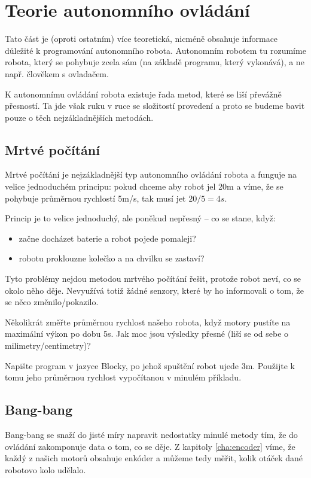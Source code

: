 \documentclass[../main.tex]{subfiles}
\begin{document}
	\section{Teorie autonomního ovládání}

	Tato část je (oproti ostatním) více teoretická, nicméně obsahuje informace důležité k programování autonomního robota. Autonomním robotem tu rozumíme robota, který se pohybuje zcela sám (na základě programu, který vykonává), a ne např. člověkem s ovladačem.

	K autonomnímu ovládání robota existuje řada metod, které se liší převážně přesností. Ta jde však  ruku v ruce se složitostí provedení a proto se budeme bavit pouze o těch nejzákladnějších metodách.

	\subsection{Mrtvé počítání}
	Mrtvé počítání je nejzákladnější typ autonomního ovládání robota a funguje na velice jednoduchém principu: pokud chceme aby robot jel \si{20m} a víme, že se pohybuje průměrnou rychlostí \si{5m/s}, tak musí jet $20 / 5 = \si{4s}$.

	Princip je to velice jednoduchý, ale poněkud nepřesný -- co se stane, když:
	\begin{itemize}
		\item začne docházet baterie a robot pojede pomaleji?
		\item robotu proklouzne kolečko a na chvilku se zastaví?
	\end{itemize}

	Tyto problémy nejdou metodou mrtvého počítání řešit, protože robot neví, co se okolo něho děje. Nevyužívá totiž žádné senzory, které by ho informovali o tom, že se něco změnilo/pokazilo.

	\begin{question}
		Několikrát změřte průměrnou rychlost našeho robota, když motory pustíte na maximální výkon po dobu \si{5s}. Jak moc jsou výsledky přesné (liší se od sebe o milimetry/centimetry)?
	\end{question}

	\begin{question}
		Napište program v jazyce Blocky, po jehož spuštění robot ujede \si{3m}. Použijte k tomu jeho průměrnou rychlost vypočítanou v minulém příkladu.
	\end{question}

	\subsection{Bang-bang}
	Bang-bang se snaží do jisté míry napravit nedostatky minulé metody tím, že do ovládání zakomponuje data o tom, co se děje. Z kapitoly \ref{cha:encoder} víme, že každý z našich motorů obsahuje enkóder a můžeme tedy měřit, kolik otáček dané robotovo kolo udělalo.
\end{document}
